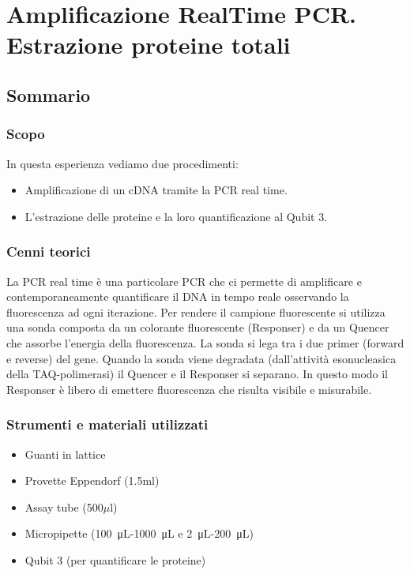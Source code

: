 \chapter{Amplificazione RealTime PCR. Estrazione proteine totali }

\vspace{0.6cm}

\section{Sommario}

\subsection{Scopo}

In questa esperienza vediamo due procedimenti:
\begin{itemize}
  \item Amplificazione di un cDNA tramite la PCR real time.
  \item L'estrazione delle proteine e la loro quantificazione al Qubit 3.
\end{itemize}

\subsection{Cenni teorici}

La PCR real time è una particolare PCR che ci permette di amplificare e
contemporaneamente quantificare il DNA in tempo reale osservando la fluorescenza
ad ogni iterazione.
Per rendere il campione fluorescente si utilizza una sonda composta da un colorante
fluorescente (Responser) e da un Quencer che assorbe l'energia della fluorescenza.
La sonda si lega tra i due primer (forward e reverse) del gene.
Quando la sonda viene degradata (dall'attivit\`a esonucleasica della TAQ-polimerasi)
il Quencer e il Responser si separano. In questo modo il Responser \`e libero di emettere
fluorescenza che risulta visibile e misurabile.

\subsection{Strumenti e materiali utilizzati}

\begin{itemize}
\item Guanti in lattice
\item Provette Eppendorf (1.5ml)
\item Assay tube (500$\mu$l)
\item Micropipette (\SI{100}{\micro\liter}-\SI{1000}{\micro\liter} e \SI{2}{\micro\liter}-\SI{200}{\micro\liter})
\item Qubit 3 (per quantificare le proteine)
\end{itemize}

